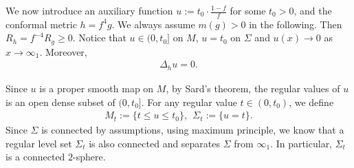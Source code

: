 \documentclass[letter]{amsart}
\theoremstyle{definition}
\theoremstyle{remark}
\begin{document}
We now introduce an auxiliary function $u := t_0\cdot  \frac{1-f}{f}$ for some $t_0>0$, and the conformal metric $h = f^{4} g$. We always assume $m(g) >0$ in the following. Then $R_h = f^{-4}R_g \geq 0$.
Notice that $u \in (0, t_0]$ on $M$, $u = t_0$ on $\Sigma $ and $u(x) \to 0$ as $x \to \infty_1$. Moreover,
\begin{align*}
	\Delta _h u =0.
\end{align*}

Since $u$ is a proper smooth map on $M$, by Sard's theorem, the regular values of $u$ is an open dense subset of $(0, t_0]$. For any regular value $t \in (0, t_0)$, we define 
\begin{align*}
	M_t := \{ t \leq u \leq t_0\} ,\ \ \Sigma_t := \{ u =t\} .
\end{align*}
Since $\Sigma $ is connected by assumptions, using maximum principle, we know that a regular level set $\Sigma_t$ is also connected and separates $\Sigma$ from $\infty_1$. In particular, $\Sigma_t$ is a connected $2$-sphere.
\end{document}
